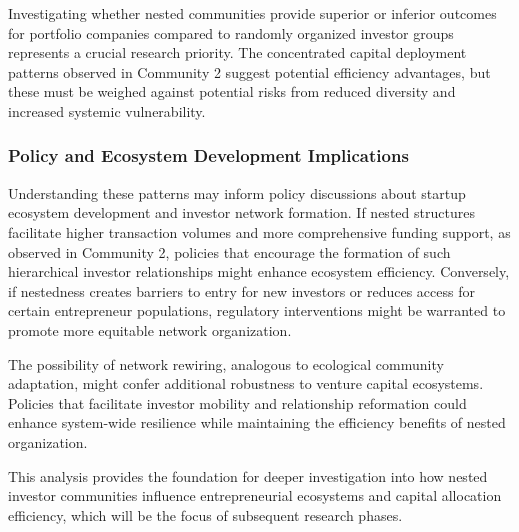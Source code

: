 Investigating whether nested communities provide superior or inferior outcomes for portfolio companies compared to randomly organized investor groups represents a crucial research priority. The concentrated capital deployment patterns observed in Community 2 suggest potential efficiency advantages, but these must be weighed against potential risks from reduced diversity and increased systemic vulnerability.

\subsubsection{Policy and Ecosystem Development Implications}

Understanding these patterns may inform policy discussions about startup ecosystem development and investor network formation. If nested structures facilitate higher transaction volumes and more comprehensive funding support, as observed in Community 2, policies that encourage the formation of such hierarchical investor relationships might enhance ecosystem efficiency. Conversely, if nestedness creates barriers to entry for new investors or reduces access for certain entrepreneur populations, regulatory interventions might be warranted to promote more equitable network organization.

The possibility of network rewiring, analogous to ecological community adaptation, might confer additional robustness to venture capital ecosystems. Policies that facilitate investor mobility and relationship reformation could enhance system-wide resilience while maintaining the efficiency benefits of nested organization.

This analysis provides the foundation for deeper investigation into how nested investor communities influence entrepreneurial ecosystems and capital allocation efficiency, which will be the focus of subsequent research phases.





